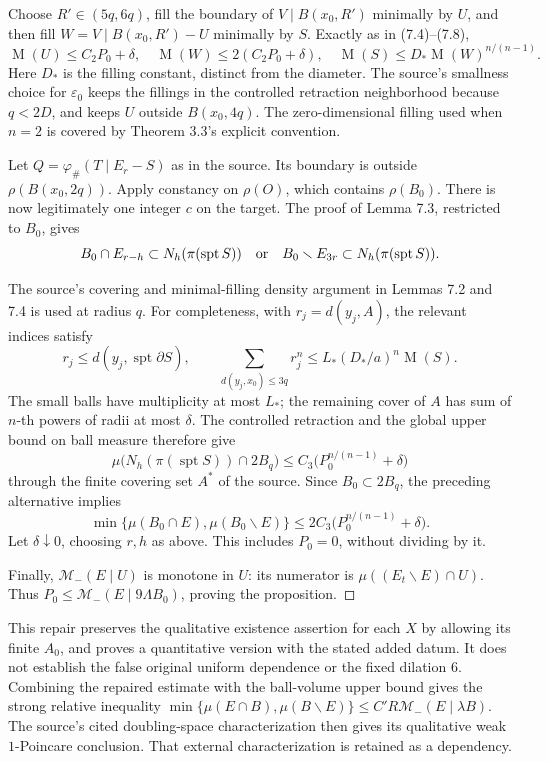 \documentclass[10pt]{article}
\begin{document}
Choose \(R'\in(5q,6q)\), fill the boundary of \(V\mathbin{\vert}B(x_0,R')\) minimally by \(U\), and then fill \(W=V\mathbin{\vert}B(x_0,R')-U\) minimally by \(S\). Exactly as in (7.4)–(7.8), \[\operatorname{M}(U)\le C_2P_0+\delta,\quad
 \operatorname{M}(W)\le2(C_2P_0+\delta),\quad
 \operatorname{M}(S)\le D_*\operatorname{M}(W)^{n/(n-1)}.\] Here \(D_*\) is the filling constant, distinct from the diameter. The source’s smallness choice for \(\varepsilon_0\) keeps the fillings in the controlled retraction neighborhood because \(q<2D\), and keeps \(U\) outside \(B(x_0,4q)\). The zero-dimensional filling used when \(n=2\) is covered by Theorem 3.3’s explicit convention.\par
Let \(Q=\varphi_\#(T\mathbin{\vert}E_r-S)\) as in the source. Its boundary is outside \(\rho(B(x_0,2q))\). Apply constancy on \(\rho(O)\), which contains \(\rho(B_0)\). There is now legitimately one integer \(c\) on the target. The proof of Lemma 7.3, restricted to \(B_0\), gives \[B_0\cap E_{r-h}\subset N_h(\pi(\operatorname{spt}S))
 \quad\hbox{or}\quad
 B_0\smallsetminus E_{3r}\subset N_h(\pi(\operatorname{spt}S)).\]\par
The source’s covering and minimal-filling density argument in Lemmas 7.2 and 7.4 is used at radius \(q\). For completeness, with \(r_j=d(y_j,A)\), the relevant indices satisfy \[r_j\le d(y_j,\operatorname{spt}\partial S),\qquad
 \sum_{d(y_j,x_0)\le3q}r_j^n
   \le L_*(D_*/a)^n\operatorname{M}(S).\] The small balls have multiplicity at most \(L_*\); the remaining cover of \(A\) has sum of \(n\)-th powers of radii at most \(\delta\). The controlled retraction and the global upper bound on ball measure therefore give \[\mu\bigl(N_h(\pi(\operatorname{spt}S))\cap2B_q\bigr)
       \le C_3\bigl(P_0^{n/(n-1)}+\delta\bigr)\] through the finite covering set \(A^*\) of the source. Since \(B_0\subset2B_q\), the preceding alternative implies \[\min\{\mu(B_0\cap E),\mu(B_0\smallsetminus E)\}
       \le2C_3\bigl(P_0^{n/(n-1)}+\delta\bigr).\] Let \(\delta\downarrow0\), choosing \(r,h\) as above. This includes \(P_0=0\), without dividing by it.\par
Finally, \(\mathcal M_-(E\mid U)\) is monotone in \(U\): its numerator is \(\mu((E_t\smallsetminus E)\cap U)\). Thus \(P_0\le\mathcal M_-(E\mid9\Lambda B_0)\), proving the proposition. ◻\par
This repair preserves the qualitative existence assertion for each \(X\) by allowing its finite \(A_0\), and proves a quantitative version with the stated added datum. It does not establish the false original uniform dependence or the fixed dilation \(6\). Combining the repaired estimate with the ball-volume upper bound gives the strong relative inequality \(\min\{\mu(E\cap B),\mu(B\smallsetminus E)\}\le C'R\mathcal M_-(E\mid\lambda B)\). The source’s cited doubling-space characterization then gives its qualitative weak \(1\)-Poincare conclusion. That external characterization is retained as a dependency.\par
\end{document}
